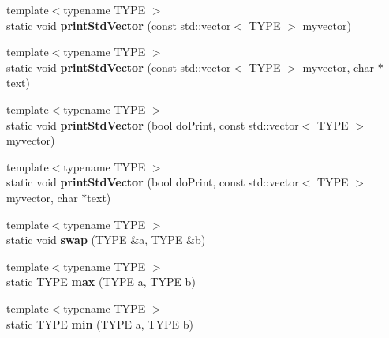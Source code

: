 \begin{DoxyCompactItemize}
\item 
\hypertarget{class_k_w_util_aaffd937290f71df67551a6f2a00e1660}{{\footnotesize template$<$typename T\-Y\-P\-E $>$ }\\static void {\bfseries print\-Std\-Vector} (const std\-::vector$<$ T\-Y\-P\-E $>$ myvector)}\label{class_k_w_util_aaffd937290f71df67551a6f2a00e1660}

\item 
\hypertarget{class_k_w_util_a8d69c11c8b97c2bc5aee5449ece9b11d}{{\footnotesize template$<$typename T\-Y\-P\-E $>$ }\\static void {\bfseries print\-Std\-Vector} (const std\-::vector$<$ T\-Y\-P\-E $>$ myvector, char $\ast$text)}\label{class_k_w_util_a8d69c11c8b97c2bc5aee5449ece9b11d}

\item 
\hypertarget{class_k_w_util_a684d6abf0326e8d495f709c2b1d82ea2}{{\footnotesize template$<$typename T\-Y\-P\-E $>$ }\\static void {\bfseries print\-Std\-Vector} (bool do\-Print, const std\-::vector$<$ T\-Y\-P\-E $>$ myvector)}\label{class_k_w_util_a684d6abf0326e8d495f709c2b1d82ea2}

\item 
\hypertarget{class_k_w_util_ac17252f672282e2f60e76d594ed2d8f7}{{\footnotesize template$<$typename T\-Y\-P\-E $>$ }\\static void {\bfseries print\-Std\-Vector} (bool do\-Print, const std\-::vector$<$ T\-Y\-P\-E $>$ myvector, char $\ast$text)}\label{class_k_w_util_ac17252f672282e2f60e76d594ed2d8f7}

\item 
\hypertarget{class_k_w_util_a6ed5d213169247c4b3fe3ed2fb96dd88}{{\footnotesize template$<$typename T\-Y\-P\-E $>$ }\\static void {\bfseries swap} (T\-Y\-P\-E \&a, T\-Y\-P\-E \&b)}\label{class_k_w_util_a6ed5d213169247c4b3fe3ed2fb96dd88}

\item 
\hypertarget{class_k_w_util_a707d699ad01c87ba21e06fe28de85712}{{\footnotesize template$<$typename T\-Y\-P\-E $>$ }\\static T\-Y\-P\-E {\bfseries max} (T\-Y\-P\-E a, T\-Y\-P\-E b)}\label{class_k_w_util_a707d699ad01c87ba21e06fe28de85712}

\item 
\hypertarget{class_k_w_util_af1b3640361810ba75435a850d73a2413}{{\footnotesize template$<$typename T\-Y\-P\-E $>$ }\\static T\-Y\-P\-E {\bfseries min} (T\-Y\-P\-E a, T\-Y\-P\-E b)}\label{class_k_w_util_af1b3640361810ba75435a850d73a2413}


\end{DoxyCompactItemize}

